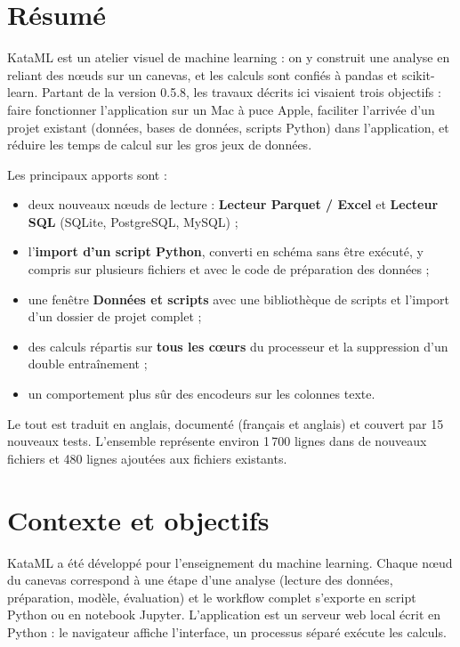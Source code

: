 \documentclass[11pt,a4paper]{article}
\newcommand{\ui}[1]{\textsf{\textbf{#1}}}   %
\begin{document}
\tableofcontents
\clearpage

\section*{Résumé}

KataML est un atelier visuel de machine learning : on y construit une analyse en
reliant des nœuds sur un canevas, et les calculs sont confiés à pandas et
scikit-learn. Partant de la version 0.5.8, les travaux décrits ici visaient trois
objectifs : faire fonctionner l'application sur un Mac à puce Apple, faciliter
l'arrivée d'un projet existant (données, bases de données, scripts Python) dans
l'application, et réduire les temps de calcul sur les gros jeux de données.

\medskip
\noindent Les principaux apports sont :
\begin{itemize}
  \item deux nouveaux nœuds de lecture : \ui{Lecteur Parquet / Excel} et
        \ui{Lecteur SQL} (SQLite, PostgreSQL, MySQL) ;
  \item l'\textbf{import d'un script Python}, converti en schéma sans être exécuté,
        y compris sur plusieurs fichiers et avec le code de préparation des données ;
  \item une fenêtre \ui{Données et scripts} avec une bibliothèque de scripts et
        l'import d'un dossier de projet complet ;
  \item des calculs répartis sur \textbf{tous les cœurs} du processeur et la
        suppression d'un double entraînement ;
  \item un comportement plus sûr des encodeurs sur les colonnes texte.
\end{itemize}

\noindent Le tout est traduit en anglais, documenté (français et anglais) et couvert
par 15 nouveaux tests. L'ensemble représente environ 1\,700 lignes dans de
nouveaux fichiers et 480 lignes ajoutées aux fichiers existants.

\section{Contexte et objectifs}

KataML a été développé pour l'enseignement du machine learning. Chaque nœud du
canevas correspond à une étape d'une analyse (lecture des données, préparation,
modèle, évaluation) et le workflow complet s'exporte en script Python ou en
notebook Jupyter. L'application est un serveur web local écrit en Python : le
navigateur affiche l'interface, un processus séparé exécute les calculs.
\end{document}
